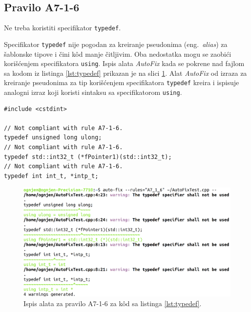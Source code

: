 \documentclass[12pt,oneside]{memoir}
\begin{document}
\subsection{Pravilo A7-1-6}
\begin{center}
\begin{tcolorbox}
Ne treba koristiti specifikator \texttt{typedef}. 
\end{tcolorbox}
\end{center}

Specifikator \texttt{typedef} nije pogodan za kreiranje pseudonima (eng.~\textit{alias}) za \v{s}ablonske tipove i \v{c}ini k\^{o}d manje \v{c}itljivim.
Oba nedostatka mogu se zaobi\'{c}i kori\v{s}\'{c}enjem specifikatora \texttt{using}.  Ispis alata \textit{AutoFix} kada se pokrene nad fajlom sa kodom iz listinga \ref{lst:typedef} prikazan je na slici \ref{fig:A7-1-6}. Alat \textit{AutoFix} od izraza za kreiranje pseudonima za tip kori\v{s}\'{c}enjem
specifikatora \texttt{typedef} kreira i ispisuje analogni izraz koji koristi sintaksu sa specifikatorom \texttt{using}.

\begin{lstlisting}[style=customc, caption={Primer koda koji nije napisan u skladu sa pravilom \textbf{A7-1-6}, odnosno koristi specifikator \texttt{typedef}.}, label=lst:typedef]
#include <cstdint>

// Not compliant with rule A7-1-6.
typedef unsigned long ulong;
// Not compliant with rule A7-1-6.
typedef std::int32_t (*fPointer1)(std::int32_t);
// Not compliant with rule A7-1-6.
typedef int int_t, *intp_t;

\end{lstlisting}

\begin{figure}[!h]
\begin{center}
\includegraphics[scale=0.22]{A7_1_6.png}
\end{center}
\caption{Ispis alata za pravilo A7-1-6 za k\^{o}d sa listinga \ref{lst:typedef}.}
\label{fig:A7-1-6}
\end{figure}
\end{document}
